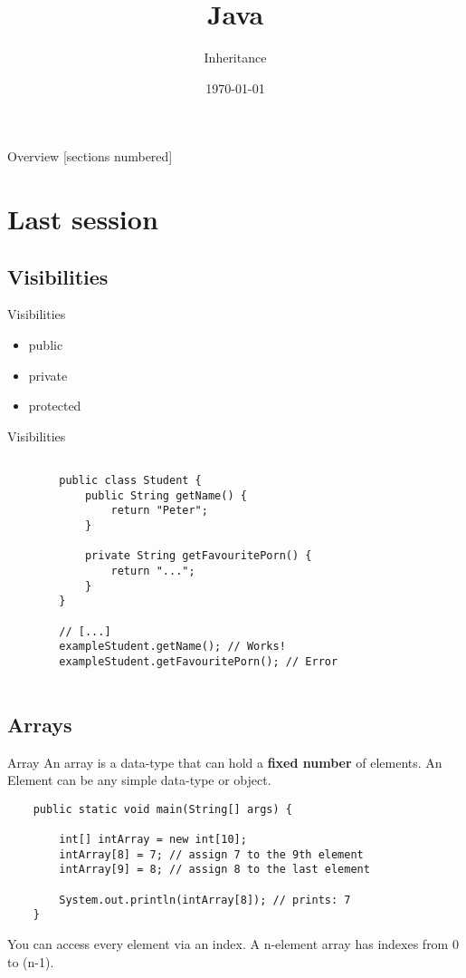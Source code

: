 


\title{Java}
\subtitle{Inheritance}
\date{\today}



\begin{frame}
	\titlepage
\end{frame}
\begin{frame}{Overview}
	[sections numbered]
	\tableofcontents
\end{frame}

\section{Last session}
\subsection{Visibilities}
\begin{frame}[fragile]{Visibilities}
	\begin{itemize}
		\item public
		\item private
		\item protected
	\end{itemize}
\end{frame}
	
\begin{frame}[fragile]{Visibilities}

	\begin{lstlisting}
	
		public class Student {
			public String getName() {
				return "Peter";
			}
			
			private String getFavouritePorn() {
				return "...";
			}
		}
	
		// [...]
		exampleStudent.getName(); // Works!
		exampleStudent.getFavouritePorn(); // Error
	
	\end{lstlisting}
	
\end{frame}


\subsection{Arrays}
\begin{frame}[fragile]{Array}
	An array is a data-type that can hold a \textbf{fixed number} of elements. 
	An Element can be any simple data-type or object.
	\begin{lstlisting}
	public static void main(String[] args) {
	
	    int[] intArray = new int[10];
	    intArray[8] = 7; // assign 7 to the 9th element
	    intArray[9] = 8; // assign 8 to the last element
	    
	    System.out.println(intArray[8]); // prints: 7
	}
	\end{lstlisting}
	You can access every element via an index. A n-element array has indexes from 0 to (n-1).
\end{frame}


